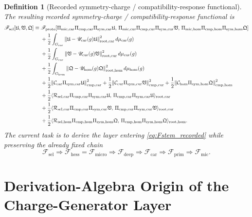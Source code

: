 \documentclass[11pt]{article}
\newcommand{\MicFunctional}{\mathscr F_{\mathrm{mic}}}
\newcommand{\PrimFunctional}{\mathscr F_{\mathrm{prim}}}
\newcommand{\CarrierFunctional}{\mathscr F_{\mathrm{car}}}
\newcommand{\DeepFunctional}{\mathscr F_{\mathrm{deep}}}
\newcommand{\ProtoFunctional}{\mathscr F_{\mathrm{proto}}}
\newcommand{\UltraFunctional}{\mathscr F_{\mathrm{micro}}}
\newcommand{\RootFunctional}{\mathscr F_{\mathrm{hess}}}
\newcommand{\StemFunctional}{\mathscr F_{\mathrm{sel}}}
\newcommand{\UltraCarProj}{\Pi_{\mathrm{mic,car}}}
\newcommand{\UltraCurProj}{\Pi_{\mathrm{mic,cur}}}
\newcommand{\UltraHomProj}{\Pi_{\mathrm{mic,hom}}}
\newcommand{\RootTensor}{\mathfrak U}
\newcommand{\RootRelabel}{\mathfrak V}
\newcommand{\RootFree}{\mathfrak Q}
\newcommand{\TensorSymProj}{\Pi_{\mathrm{sym,car}}}
\newcommand{\CurSymProj}{\Pi_{\mathrm{sym,cur}}}
\newcommand{\HomSymProj}{\Pi_{\mathrm{sym,hom}}}
\newcommand{\TensorCompat}{\mathcal C_{\mathrm{car}}}
\newcommand{\CurCompat}{\mathcal C_{\mathrm{cur}}}
\newcommand{\HomCompat}{\mathcal C_{\mathrm{hom}}}
\newcommand{\TensorCmpProj}{\Pi_{\mathrm{cmp,car}}}
\newcommand{\CurCmpProj}{\Pi_{\mathrm{cmp,cur}}}
\newcommand{\HomCmpProj}{\Pi_{\mathrm{cmp,hom}}}
\newcommand{\TensorSymGroup}{G_{\mathrm{car}}}
\newcommand{\CurSymGroup}{G_{\mathrm{cur}}}
\newcommand{\HomSymGroup}{G_{\mathrm{hom}}}
\newcommand{\TensorSymAct}{\mathscr U_{\mathrm{car}}}
\newcommand{\CurSymAct}{\mathscr U_{\mathrm{cur}}}
\newcommand{\HomSymAct}{\mathscr U_{\mathrm{hom}}}
\newcommand{\TensorResp}{\mathcal R_{\mathrm{sel,car}}}
\newcommand{\CurResp}{\mathcal R_{\mathrm{sel,cur}}}
\newcommand{\HomResp}{\mathcal R_{\mathrm{sel,hom}}}
\newtheorem{definition}{Definition}
\begin{document}
\begin{definition}[Recorded symmetry-charge / compatibility-response functional]
\label{def:recorded_functional}
The resulting recorded symmetry-charge / compatibility-response functional is
\begin{equation}
\begin{aligned}
\StemFunctional[\RootTensor,\RootRelabel,\RootFree]
\equiv\;
&\ProtoFunctional[
\UltraCarProj\TensorCmpProj\TensorSymProj\RootTensor,\,
\UltraCurProj\CurCmpProj\CurSymProj\RootRelabel,\,
\UltraHomProj\HomCmpProj\HomSymProj\RootFree]
\\
&+\frac12\int_{\TensorSymGroup}
\norm{\RootTensor-\TensorSymAct(g)\RootTensor}_{\mathrm{root,car}}^2\,
d\mu_{\mathrm{car}}(g)
\\
&+\frac12\int_{\CurSymGroup}
\norm{\RootRelabel-\CurSymAct(g)\RootRelabel}_{\mathrm{root,cur}}^2\,
d\mu_{\mathrm{cur}}(g)
\\
&+\frac12\int_{\HomSymGroup}
\norm{\RootFree-\HomSymAct(g)\RootFree}_{\mathrm{root,hom}}^2\,
d\mu_{\mathrm{hom}}(g)
\\
&+\frac12\norm{\TensorCompat\TensorSymProj\RootTensor}_{\mathrm{cmp,car}}^2
+\frac12\norm{\CurCompat\CurSymProj\RootRelabel}_{\mathrm{cmp,cur}}^2
+\frac12\norm{\HomCompat\HomSymProj\RootFree}_{\mathrm{cmp,hom}}^2
\\
&+\frac12\langle \TensorResp\TensorCmpProj\TensorSymProj\RootTensor,\,
\TensorCmpProj\TensorSymProj\RootTensor\rangle_{\mathrm{root,car}}
\\
&+\frac12\langle \CurResp\CurCmpProj\CurSymProj\RootRelabel,\,
\CurCmpProj\CurSymProj\RootRelabel\rangle_{\mathrm{root,cur}}
\\
&+\frac12\langle \HomResp\HomCmpProj\HomSymProj\RootFree,\,
\HomCmpProj\HomSymProj\RootFree\rangle_{\mathrm{root,hom}}.
\end{aligned}
\label{eq:Fstem_recorded}
\end{equation}
The current task is to derive the layer entering \eqref{eq:Fstem_recorded} while preserving the already fixed chain
\begin{equation}
\StemFunctional
\Longrightarrow
\RootFunctional=\UltraFunctional
\Longrightarrow
\DeepFunctional
\Longrightarrow
\CarrierFunctional
\Longrightarrow
\PrimFunctional
\Longrightarrow
\MicFunctional.
\label{eq:chain}
\end{equation}
\end{definition}

\section{Derivation-Algebra Origin of the Charge-Generator Layer}
\end{document}
